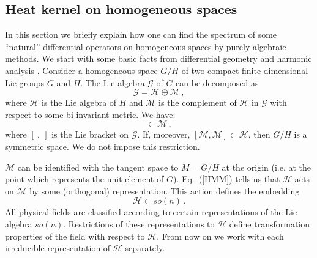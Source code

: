 \subsection{Heat kernel on homogeneous spaces}\label{s8homo}
In this section we briefly explain how one can find
the spectrum of some ``natural'' differential
operators on homogeneous spaces
by purely algebraic methods. We start with
some basic facts from differential geometry and harmonic analysis
\cite{Kobayashi:1969,Helgason:1984}. 
Consider a homogeneous space $G/H$ of
two compact finite-dimensional Lie groups $G$ and $H$.
The Lie algebra $\mathcal{G}$ of $G$ can be decomposed as
\begin{equation}
\mathcal{G}=\mathcal{H}\oplus \mathcal{M} \,,\label{Gdecom}
\end{equation}
where $\mathcal{H}$ is the Lie algebra of $H$ and $\mathcal{M}$
is the complement of $\mathcal{H}$ in $\mathcal{G}$ with
respect to some bi-invariant metric. We have:
\begin{equation}
[\mathcal{H},\mathcal{M}] \subset \mathcal{M} \,,\label{HMM}
\end{equation}
where $[\ ,\ ]$ is the Lie bracket on $\mathcal{G}$. If, moreover,
$[\mathcal{M},\mathcal{M}]\subset \mathcal{H}$, then $G/H$ is a
symmetric space. We do not impose this restriction.

$\mathcal{M}$ can be identified with the tangent space to $M=G/H$
at the origin (i.e. at the point which represents the unit element of $G$).
Eq.\ (\ref{HMM}) tells us that $\mathcal{H}$ acts on $\mathcal{M}$
by some (orthogonal) representation. This action defines the embedding
\begin{equation}
\mathcal{H}\subset so(n) \,.\label{Hinso}
\end{equation}
All physical fields are classified according to certain representations
of the Lie algebra $so(n)$. Restrictions of these representations to
$\mathcal{H}$ define transformation properties of the field with
respect to $\mathcal{H}$. From now on we work with each irreducible
representation of $\mathcal{H}$ separately.

